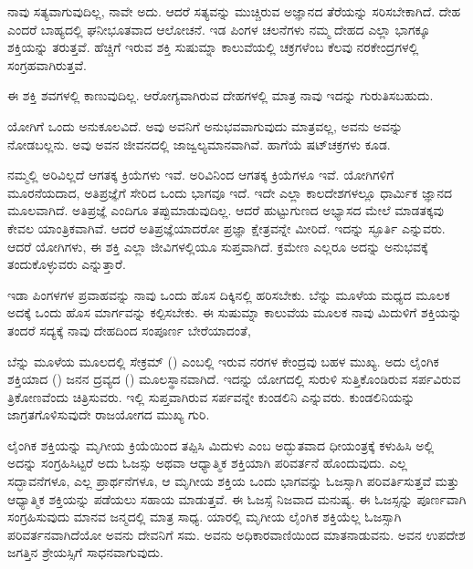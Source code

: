 \vskip 2pt

ನಾವು ಸತ್ಯವಾಗುವುದಿಲ್ಲ, ನಾವೇ ಅದು. ಆದರೆ ಸತ್ಯವನ್ನು ಮುಚ್ಚಿರುವ ಅಜ್ಞಾನದ ತೆರೆಯನ್ನು ಸರಿಸಬೇಕಾಗಿದೆ. ದೇಹ ಎಂದರೆ ಬಾಹ್ಯದಲ್ಲಿ ಘನೀಭೂತವಾದ ಆಲೋಚನೆ. ಇಡ ಪಿಂಗಳ ಚಲನೆಗಳು ನಮ್ಮ ದೇಹದ ಎಲ್ಲಾ ಭಾಗಕ್ಕೂ ಶಕ್ತಿಯನ್ನು ತರುತ್ತವೆ. ಹೆಚ್ಚಿಗೆ ಇರುವ ಶಕ್ತಿ ಸುಷುಮ್ನಾ ಕಾಲುವೆಯಲ್ಲಿ ಚಕ್ರಗಳೆಂಬ ಕೆಲವು ನರಕೇಂದ್ರಗಳಲ್ಲಿ ಸಂಗ್ರಹವಾಗಿರುತ್ತವೆ.

\vskip 2pt

ಈ ಶಕ್ತಿ ಶವಗಳಲ್ಲಿ ಕಾಣುವುದಿಲ್ಲ. ಆರೋಗ್ಯವಾಗಿರುವ ದೇಹಗಳಲ್ಲಿ ಮಾತ್ರ ನಾವು ಇದನ್ನು ಗುರುತಿಸಬಹುದು.

\vskip 2pt

ಯೋಗಿಗೆ ಒಂದು ಅನುಕೂಲವಿದೆ. ಅವು ಅವನಿಗೆ ಅನುಭವವಾಗುವುದು ಮಾತ್ರವಲ್ಲ, ಅವನು ಅವನ್ನು ನೋಡಬಲ್ಲನು. ಅವು ಅವನ ಜೀವನದಲ್ಲಿ ಜಾಜ್ವಲ್ಯಮಾನವಾಗಿವೆ. ಹಾಗೆಯೆ ಷಟ್‌ಚಕ್ರಗಳು ಕೂಡ.

\newpage

ನಮ್ಮಲ್ಲಿ ಅರಿವಿಲ್ಲದೆ ಆಗತಕ್ಕ ಕ್ರಿಯೆಗಳು ಇವೆ. ಅರಿವಿನಿಂದ ಆಗತಕ್ಕ ಕ್ರಿಯೆಗಳೂ ಇವೆ. ಯೋಗಿಗಳಿಗೆ ಮೂರನೆಯದಾದ, ಅತಿಪ್ರಜ್ಞೆಗೆ ಸೇರಿದ ಒಂದು ಭಾಗವೂ ಇದೆ. ಇದೇ ಎಲ್ಲಾ ಕಾಲದೇಶಗಳಲ್ಲೂ ಧಾರ್ಮಿಕ ಜ್ಞಾನದ ಮೂಲವಾಗಿದೆ. ಅತಿಪ್ರಜ್ಞೆ ಎಂದಿಗೂ ತಪ್ಪುಮಾಡುವುದಿಲ್ಲ. ಆದರೆ ಹುಟ್ಟುಗುಣದ ಅಭ್ಯಾಸದ ಮೇಲೆ ಮಾಡತಕ್ಕವು ಕೇವಲ ಯಾಂತ್ರಿಕವಾಗಿವೆ. ಆದರೆ ಅತಿಪ್ರಜ್ಞೆಯಾದರೋ ಪ್ರಜ್ಞಾ ಕ್ಷೇತ್ರವನ್ನೇ ಮೀರಿದೆ. ಇದನ್ನು ಸ್ಫೂರ್ತಿ ಎನ್ನುವರು. ಆದರೆ ಯೋಗಿಗಳು, ಈ ಶಕ್ತಿ ಎಲ್ಲಾ ಜೀವಿಗಳಲ್ಲಿಯೂ ಸುಪ್ತವಾಗಿದೆ. ಕ್ರಮೇಣ ಎಲ್ಲರೂ ಅದನ್ನು ಅನುಭವಕ್ಕೆ ತಂದುಕೊಳ್ಳುವರು ಎನ್ನುತ್ತಾರೆ.

\vskip 2pt

ಇಡಾ ಪಿಂಗಳಗಳ ಪ್ರವಾಹವನ್ನು ನಾವು ಒಂದು ಹೊಸ ದಿಕ್ಕಿನಲ್ಲಿ ಹರಿಸಬೇಕು. ಬೆನ್ನು ಮೂಳೆಯ ಮಧ್ಯದ ಮೂಲಕ ಅದಕ್ಕೆ ಒಂದು ಹೊಸ ಮಾರ್ಗವನ್ನು ಕಲ್ಪಿಸಬೇಕು. ಈ ಸುಷುಮ್ನಾ ಕಾಲುವೆಯ ಮೂಲಕ ನಾವು ಮಿದುಳಿಗೆ ಶಕ್ತಿಯನ್ನು ತಂದರೆ ಸದ್ಯಕ್ಕೆ ನಾವು ದೇಹದಿಂದ ಸಂಪೂರ್ಣ ಬೇರೆಯಾದಂತೆ,

\vskip 2pt

ಬೆನ್ನು ಮೂಳೆಯ ಮೂಲದಲ್ಲಿ ಸೇಕ್ರಮ್ () ಎಂಬಲ್ಲಿ ಇರುವ ನರಗಳ ಕೇಂದ್ರವು ಬಹಳ ಮುಖ್ಯ. ಅದು ಲೈಂಗಿಕ ಶಕ್ತಿಯಾದ () ಜನನ ದ್ರವ್ಯದ () ಮೂಲಸ್ಥಾನವಾಗಿದೆ. ಇದನ್ನು ಯೋಗದಲ್ಲಿ ಸುರುಳಿ ಸುತ್ತಿಕೊಂಡಿರುವ ಸರ್ಪವಿರುವ ತ್ರಿಕೋಣವೆಂದು ಚಿತ್ರಿಸುವರು. ಇಲ್ಲಿ ಸುಪ್ತವಾಗಿರುವ ಸರ್ಪವನ್ನೇ ಕುಂಡಲಿನಿ ಎನ್ನುವರು. ಕುಂಡಲಿನಿಯನ್ನು ಜಾಗ್ರತಗೊಳಿಸುವುದೇ ರಾಜಯೋಗದ ಮುಖ್ಯ ಗುರಿ.

\vskip 2pt

ಲೈಂಗಿಕ ಶಕ್ತಿಯನ್ನು ಮೃಗೀಯ ಕ್ರಿಯೆಯಿಂದ ತಪ್ಪಿಸಿ ಮಿದುಳು ಎಂಬ ಅದ್ಭುತವಾದ ಧೀಯಂತ್ರಕ್ಕೆ ಕಳುಹಿಸಿ ಅಲ್ಲಿ ಅದನ್ನು ಸಂಗ್ರಹಿಸಿಟ್ಟರೆ ಅದು ಓಜಸ್ಸು ಅಥವಾ ಆಧ್ಯಾತ್ಮಿಕ ಶಕ್ತಿಯಾಗಿ ಪರಿವರ್ತನೆ ಹೊಂದುವುದು. ಎಲ್ಲ ಸದ್ಭಾವನೆಗಳೂ, ಎಲ್ಲ ಪ್ರಾರ್ಥನೆಗಳೂ, ಆ ಮೃಗೀಯ ಶಕ್ತಿಯ ಒಂದು ಭಾಗವನ್ನು ಓಜಸ್ಸಾಗಿ ಪರಿವರ್ತಿಸುತ್ತವೆ ಮತ್ತು ಆಧ್ಯಾತ್ಮಿಕ ಶಕ್ತಿಯನ್ನು ಪಡೆಯಲು ಸಹಾಯ ಮಾಡುತ್ತವೆ. ಈ ಓಜಸ್ಸೆ ನಿಜವಾದ ಮನುಷ್ಯ. ಈ ಓಜಸ್ಸನ್ನು ಪೂರ್ಣವಾಗಿ ಸಂಗ್ರಹಿಸುವುದು ಮಾನವ ಜನ್ಮದಲ್ಲಿ ಮಾತ್ರ ಸಾಧ್ಯ. ಯಾರಲ್ಲಿ ಮೃಗೀಯ ಲೈಂಗಿಕ ಶಕ್ತಿಯೆಲ್ಲ ಓಜಸ್ಸಾಗಿ ಪರಿವರ್ತನವಾಗಿದೆಯೋ ಅವನು ದೇವನಿಗೆ ಸಮ. ಅವನು ಅಧಿಕಾರವಾಣಿಯಿಂದ ಮಾತನಾಡುವನು. ಅವನ ಉಪದೇಶ ಜಗತ್ತಿನ ಶ್ರೇಯಸ್ಸಿಗೆ ಸಾಧನವಾಗುವುದು.

